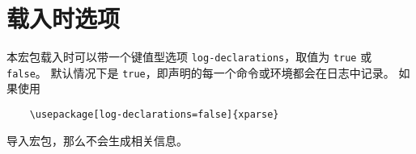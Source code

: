 \documentclass{l3doc}
\begin{document}
%
\section{载入时选项}

%
%
本宏包载入时可以带一个键值型选项 \texttt{log-declarations}，取值为 \texttt{true} 或 \texttt{false}。
默认情况下是 \texttt{true}，即声明的每一个命令或环境都会在日志中记录。
如果使用
\begin{verbatim}
    \usepackage[log-declarations=false]{xparse}
\end{verbatim}
导入宏包，那么不会生成相关信息。
\end{document}
